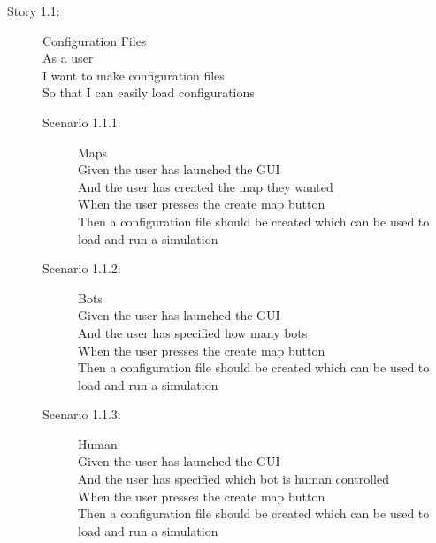 \begin{description}
	\item[Story 1.1:] Configuration Files\\
	As a user\\
	I want to make configuration files\\
	So that I can easily load configurations

	\begin{description}
		\item[Scenario 1.1.1:] Maps\\
		Given the user has launched the GUI\\
		And the user has created the map they wanted\\
		When the user presses the create map button\\
		Then a configuration file should be created which can be used to load and run a simulation
		
		\item[Scenario 1.1.2:] Bots\\
		Given the user has launched the GUI\\
		And the user has specified how many bots\\
		When the user presses the create map button\\
		Then a configuration file should be created which can be used to load and run a simulation

		\item[Scenario 1.1.3:] Human\\
		Given the user has launched the GUI\\
		And the user has specified which bot is human controlled\\
		When the user presses the create map button\\
		Then a configuration file should be created which can be used to load and run a simulation
	\end{description}
\end{description}

